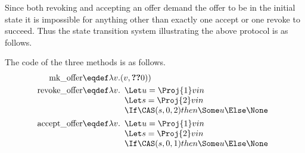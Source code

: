 Since both revoking and accepting an offer demand the offer to be in the initial state it is impossible for anything other than exactly one accept or one revoke to succeed.
Thus the state transition system illustrating the above protocol is as follows.
\begin{center}
\end{center}
The code of the three methods is as follows.
\newcommand{\mkoffer}{\operatorname{mk\_offer}}
\newcommand{\revoke}{\operatorname{revoke\_offer}}
\newcommand{\accept}{\operatorname{accept\_offer}}
\begin{align*}
  \mkoffer &\eqdef \lambda v. (v, \Ref(0))\\
  \revoke &\eqdef \lambda v. \begin{array}[t]{l}
                               \Let u = \Proj{1}v in\\
                               \Let s = \Proj{2}v in\\
                               \If \CAS(s, 0, 2) then \Some u \Else \None
                             \end{array}\\
  \accept &\eqdef \lambda v. \begin{array}[t]{l}
                    \Let u = \Proj{1}v in\\
                    \Let s = \Proj{2}v in\\
                    \If \CAS(s, 0, 1) then \Some u \Else \None
                  \end{array}
\end{align*}

